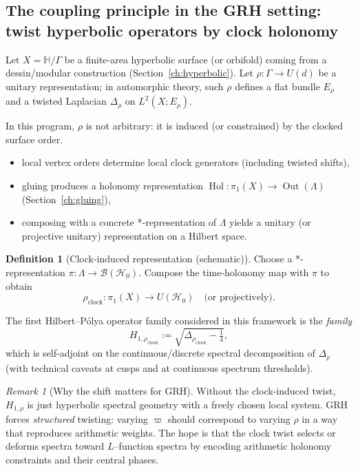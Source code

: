 \documentclass[11pt,oneside]{amsbook}
\numberwithin{equation}{section}
\theoremstyle{plain}
\theoremstyle{definition}
\newtheorem{definition}[theorem]{Definition}
\theoremstyle{remark}
\newtheorem{remark}[theorem]{Remark}
\newcommand{\HH}{\mathbb{H}}
\DeclareMathOperator{\Hol}{\mathrm{Hol}}
\DeclareMathOperator{\Out}{\mathrm{Out}}
\begin{document}
\subsection{The coupling principle in the GRH setting: twist hyperbolic operators by clock holonomy}
\label{sec:coupling_principle_GRH}

Let $X=\HH/\Gamma$ be a finite-area hyperbolic surface (or orbifold) coming from a dessin/modular construction (Section~\ref{ch:hyperbolic}).
Let $\rho:\Gamma\to U(d)$ be a unitary representation; in automorphic theory, such $\rho$ defines a flat bundle $E_\rho$ and a twisted Laplacian $\Delta_\rho$ on $L^2(X;E_\rho)$.

In this program, $\rho$ is not arbitrary: it is induced (or constrained) by the clocked surface order.

\begin{itemize}
\item local vertex orders determine local clock generators (including twisted shifts),
\item gluing produces a holonomy representation $\Hol:\pi_1(X)\to \Out(\Lambda)$ (Section~\ref{ch:gluing}),
\item composing with a concrete *-representation of $\Lambda$ yields a unitary (or projective unitary) representation on a Hilbert space.
\end{itemize}

\begin{definition}[Clock-induced representation (schematic)]
Choose a *-representation $\pi:\Lambda\to \mathcal{B}(\mathcal{H}_0)$.
Compose the time-holonomy map with $\pi$ to obtain
\[
\rho_{\mathrm{clock}}:\pi_1(X)\to U(\mathcal{H}_0)\quad\text{(or projectively)}.
\]
\end{definition}

The first Hilbert--Pólya operator family considered in this framework is the \emph{family}
\begin{equation}
\label{eq:HP_candidate_1_GRH}
H_{1,\rho_{\mathrm{clock}}}:=\sqrt{\Delta_{\rho_{\mathrm{clock}}}-\tfrac14},
\end{equation}
which is self-adjoint on the continuous/discrete spectral decomposition of $\Delta_{\rho}$ (with technical caveats at cusps and at continuous spectrum thresholds).

\begin{remark}[Why the shift matters for GRH]
Without the clock-induced twist, $H_{1,\rho}$ is just hyperbolic spectral geometry with a freely chosen local system.
GRH forces \emph{structured} twisting: varying $\varpi$ should correspond to varying $\rho$ in a way that reproduces arithmetic weights.
The hope is that the clock twist selects or deforms spectra toward $L$--function spectra by encoding arithmetic holonomy constraints and their central phases.
\end{remark}
\end{document}

